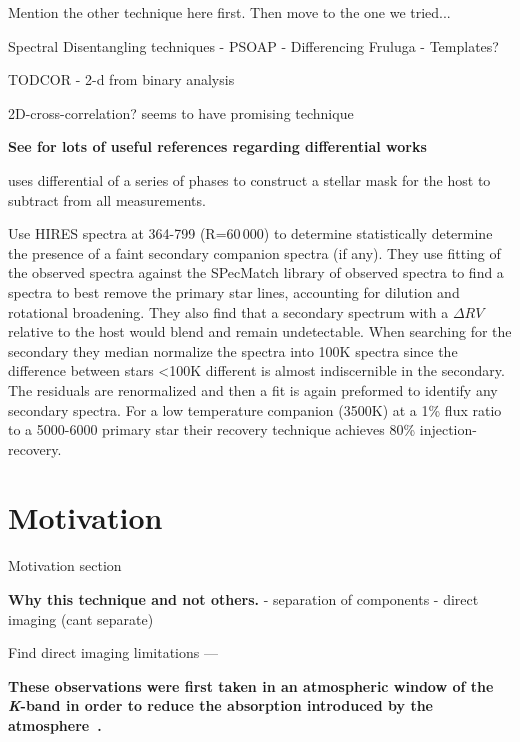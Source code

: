 Mention the other technique here first.
Then move to the one we tried...




Spectral Disentangling techniques
- PSOAP
- Differencing Fruluga
- Templates?

TODCOR - 2-d from binary analysis \citep{zucker_study_1994}
\citep{mazeh_detecting_1997}

2D-cross-correlation?   \citet{piskorz_evidence_2016} seems to have promising technique


\textbf{
See \citet{kostogryz_spectral_2013} for lots of useful references regarding differential works \citet{simon_disentangling_1994}}

\citet{rodler_weighing_2012} uses differential of a series of phases to construct a stellar mask for the host to subtract from all measurements.



{\red{} \citet{kolbl_detection_2015} Use HIRES spectra at 364-799\nm{} (R=60\,000) to determine statistically determine the presence of a faint secondary companion spectra (if any).
They use \textchisquared fitting of the observed spectra against the {SPecMatch} library of observed spectra to find a spectra to best remove the primary star lines,
accounting for dilution and rotational broadening.
They also find that a secondary spectrum with a $\Delta RV$ relative to the host would blend and remain undetectable.
When searching for the secondary they median normalize the spectra into 100K spectra since the difference between stars  <100K different is almost indiscernible in the secondary. The residuals are renormalized and then a \textchisquared fit is again preformed to identify any secondary spectra.
For a low temperature companion (3500K) at a 1\% flux ratio to a 5000-6000\K{} primary star their recovery technique achieves 80\% injection-recovery.}



\section{Motivation}

Motivation section

\textbf{Why this technique and not others.}
- separation of components
- direct imaging (cant separate)


Find direct imaging limitations ---



\textbf{These observations were first taken in an atmospheric window of the \emph{K}-band in order to reduce the absorption introduced by the atmosphere~\citep{barnes_hd_2008}.
}
